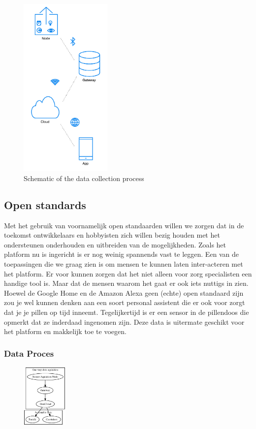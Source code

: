\documentclass{below-ext}
\begin{document}
\begin{figure}
\center
\includegraphics[width=0.4\textwidth]{dataproces.pdf}
\caption{Schematic of the data collection process}
\end{figure}

\subsection{Open standards}
Met het gebruik van voornamelijk open standaarden willen we zorgen dat in de toekomst ontwikkelaars en hobbyisten zich willen bezig houden met het ondersteunen onderhouden en uitbreiden van de mogelijkheden. Zoals het platform nu is ingericht is er nog weinig spannends vast te leggen. Een van de toepassingen die we graag zien is om mensen te kunnen laten inter-acteren met het platform. Er voor kunnen zorgen dat het niet alleen voor zorg specialisten een handige tool is. Maar dat de mensen waarom het gaat er ook iets nuttigs in zien. Hoewel de Google Home en de Amazon Alexa geen (echte) open standaard zijn zou je wel kunnen denken aan een soort personal assistent die er ook voor zorgt dat je je pillen op tijd inneemt. Tegelijkertijd is er een sensor in de pillendoos die opmerkt dat ze inderdaad ingenomen zijn. Deze data is uitermate geschikt voor het platform en makkelijk toe te voegen.
\subsubsection{Data Proces}
\begin{figure}
\center
\includegraphics[width=0.2\textwidth]{process}
\end{figure}
\end{document}
